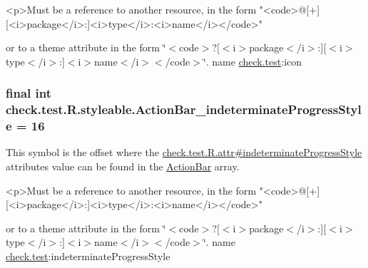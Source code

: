 \begin{DoxyVerb}      <p>Must be a reference to another resource, in the form "<code>@[+][<i>package</i>:]<i>type</i>:<i>name</i></code>"
\end{DoxyVerb}
 or to a theme attribute in the form \char`\"{}$<$code$>$?\mbox{[}$<$i$>$package$<$/i$>$\+:\mbox{]}\mbox{[}$<$i$>$type$<$/i$>$\+:\mbox{]}$<$i$>$name$<$/i$>$$<$/code$>$\char`\"{}.  name \hyperlink{namespacecheck_1_1test}{check.\+test}\+:icon \hypertarget{classcheck_1_1test_1_1_r_1_1styleable_aa15c171a89aa6949c69bf05ac296389c}{}
\subsubsection[{Action\+Bar\+\_\+indeterminate\+Progress\+Style}]{\setlength{\rightskip}{0pt plus 5cm}final int check.\+test.\+R.\+styleable.\+Action\+Bar\+\_\+indeterminate\+Progress\+Style = 16\hspace{0.3cm}{\ttfamily [static]}}\label{classcheck_1_1test_1_1_r_1_1styleable_aa15c171a89aa6949c69bf05ac296389c}
This symbol is the offset where the \hyperlink{classcheck_1_1test_1_1_r_1_1attr_a2582eb7d8088fc5a12dda81d97afd3f6}{check.\+test.\+R.\+attr\#indeterminate\+Progress\+Style} attribute\textquotesingle{}s value can be found in the \hyperlink{classcheck_1_1test_1_1_r_1_1styleable_ad0a4d403cb244ea4d22c6f6ebf2c2cdf}{Action\+Bar} array.

\begin{DoxyVerb}      <p>Must be a reference to another resource, in the form "<code>@[+][<i>package</i>:]<i>type</i>:<i>name</i></code>"
\end{DoxyVerb}
 or to a theme attribute in the form \char`\"{}$<$code$>$?\mbox{[}$<$i$>$package$<$/i$>$\+:\mbox{]}\mbox{[}$<$i$>$type$<$/i$>$\+:\mbox{]}$<$i$>$name$<$/i$>$$<$/code$>$\char`\"{}.  name \hyperlink{namespacecheck_1_1test}{check.\+test}\+:indeterminate\+Progress\+Style \hypertarget{classcheck_1_1test_1_1_r_1_1styleable_a1e919ff125d9a130e6515a258bc0ebbd}{}
